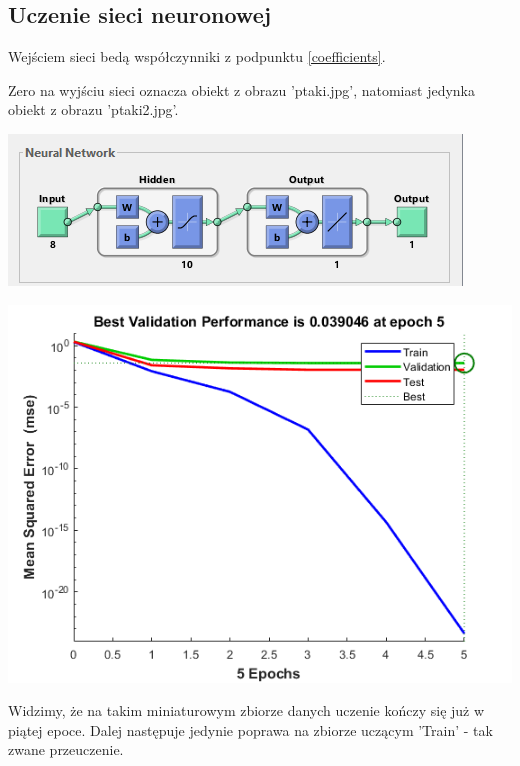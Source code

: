 \documentclass{article}
\begin{document}
	\subsection{Uczenie sieci neuronowej}
	Wejściem sieci bedą współczynniki z podpunktu \ref{coefficients}.
	
	Zero na wyjściu sieci oznacza obiekt z obrazu 'ptaki.jpg', natomiast jedynka obiekt z obrazu 'ptaki2.jpg'.
	
	\begin{center}
		\includegraphics[width=\linewidth]{../../lab07/neural_net.png}
	\end{center}

	\begin{center}
		\includegraphics[width=\linewidth]{../../lab07/nn_performance.png}
	\end{center}
	Widzimy, że na takim miniaturowym zbiorze danych uczenie kończy się już w piątej epoce. Dalej następuje jedynie poprawa na zbiorze uczącym 'Train' - tak zwane przeuczenie.
	
\end{document}
